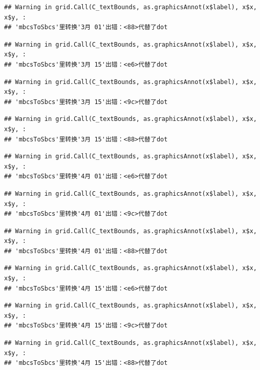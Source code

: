 \documentclass[
]{article}
\begin{document}
\begin{verbatim}
## Warning in grid.Call(C_textBounds, as.graphicsAnnot(x$label), x$x, x$y, :
## 'mbcsToSbcs'里转换'3月 01'出错：<88>代替了dot
\end{verbatim}

\begin{verbatim}
## Warning in grid.Call(C_textBounds, as.graphicsAnnot(x$label), x$x, x$y, :
## 'mbcsToSbcs'里转换'3月 15'出错：<e6>代替了dot
\end{verbatim}

\begin{verbatim}
## Warning in grid.Call(C_textBounds, as.graphicsAnnot(x$label), x$x, x$y, :
## 'mbcsToSbcs'里转换'3月 15'出错：<9c>代替了dot
\end{verbatim}

\begin{verbatim}
## Warning in grid.Call(C_textBounds, as.graphicsAnnot(x$label), x$x, x$y, :
## 'mbcsToSbcs'里转换'3月 15'出错：<88>代替了dot
\end{verbatim}

\begin{verbatim}
## Warning in grid.Call(C_textBounds, as.graphicsAnnot(x$label), x$x, x$y, :
## 'mbcsToSbcs'里转换'4月 01'出错：<e6>代替了dot
\end{verbatim}

\begin{verbatim}
## Warning in grid.Call(C_textBounds, as.graphicsAnnot(x$label), x$x, x$y, :
## 'mbcsToSbcs'里转换'4月 01'出错：<9c>代替了dot
\end{verbatim}

\begin{verbatim}
## Warning in grid.Call(C_textBounds, as.graphicsAnnot(x$label), x$x, x$y, :
## 'mbcsToSbcs'里转换'4月 01'出错：<88>代替了dot
\end{verbatim}

\begin{verbatim}
## Warning in grid.Call(C_textBounds, as.graphicsAnnot(x$label), x$x, x$y, :
## 'mbcsToSbcs'里转换'4月 15'出错：<e6>代替了dot
\end{verbatim}

\begin{verbatim}
## Warning in grid.Call(C_textBounds, as.graphicsAnnot(x$label), x$x, x$y, :
## 'mbcsToSbcs'里转换'4月 15'出错：<9c>代替了dot
\end{verbatim}

\begin{verbatim}
## Warning in grid.Call(C_textBounds, as.graphicsAnnot(x$label), x$x, x$y, :
## 'mbcsToSbcs'里转换'4月 15'出错：<88>代替了dot
\end{verbatim}
\end{document}

